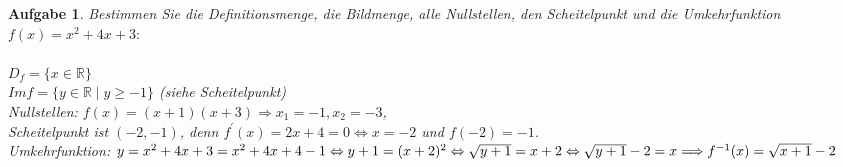 \documentclass[12pt]{article}
\newtheorem{exercise}[satz]{Aufgabe}
\begin{document}
   \begin{exercise}
  Bestimmen Sie die Definitionsmenge, die Bildmenge, alle Nullstellen, den Scheitelpunkt und die Umkehrfunktion $f(x) = x^2+4x+3:$ \\ \\
  $D_f = \{x \in \mathbb{R}\}$\\
  $Im f = \{y \in \mathbb{R}\mid y\geq -1\}$ (siehe Scheitelpunkt)\\
  Nullstellen: $f(x) = (x+1)(x+3) \Rightarrow x_1 = -1, x_2 = -3$,\\
  Scheitelpunkt ist $(-2,-1)$, denn $f^\prime(x) = 2x+4 = 0 \Leftrightarrow x = -2$ und $f(-2) = -1$.\\
  Umkehrfunktion: $y = x^2+4x+3 = x^2+4x+4-1 \Leftrightarrow y+1=(x+2)^2 \Leftrightarrow \sqrt{y+1} = x+2 \Leftrightarrow \sqrt{y+1} -2 = x \hfill \Longrightarrow f^{-1}(x) = \sqrt{x+1}-2$
   \end{exercise}
\end{document}
